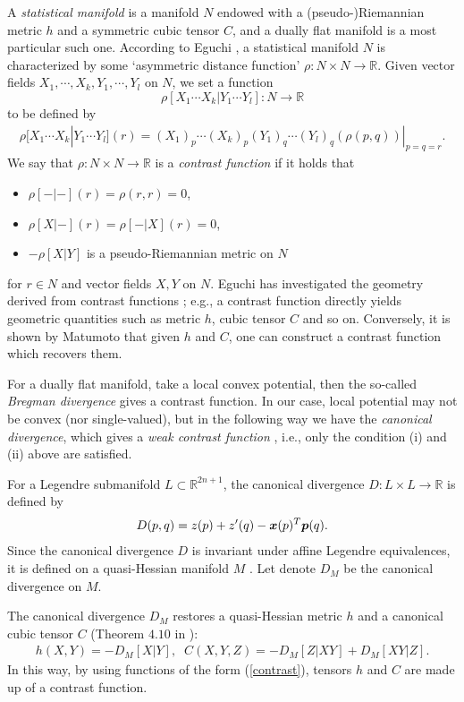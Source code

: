 \documentclass[10pt]{amsart}
\newcommand{\R}{\mathbb{R}}
\def\bx{\mbox{\boldmath $x$}}
\def\bp{\mbox{\boldmath $p$}}
\begin{document}
A {\em statistical manifold} is a manifold $N$ endowed with a (pseudo-)Riemannian metric $h$ and a symmetric cubic tensor $C$, 
and a dually flat manifold is a most particular such one. 
According to Eguchi \cite{Eguchi},  a statistical manifold $N$ is characterized by some `asymmetric distance function' $\rho: N \times N \to \R$. 
Given vector fields $X_1, \cdots, X_k, Y_1,\cdots, Y_l$ on $N$, 
we set a function 
$$\rho[X_1\cdots X_k|Y_1\cdots Y_l]:N\to\R$$
to be defined by
\begin{align}\label{contrast}
\rho[X_1\cdots X_k|Y_1\cdots Y_l](r) = (X_1)_p\cdots(X_k)_p(Y_1)_q\cdots(Y_l)_q(\rho(p,q))|_{p=q=r}. 
\end{align}
We say that $\rho:N\times N\to\R$ is a {\em contrast function} if it holds that
\begin{itemize}
\item[(i)] $\rho[-|-](r)=\rho(r,r) = 0$,
\item[(ii)] $\rho[X|-](r) = \rho[-|X](r) = 0$,
\item[(iii)] $-\rho[X|Y]$ is a pseudo-Riemannian metric on $N$
\end{itemize} 
for $r\in N$ and vector fields $X, Y$ on $N$. 
Eguchi has investigated the geometry derived from contrast functions \cite{Eguchi}; e.g., 
a contrast function directly yields geometric quantities such as metric $h$, cubic tensor $C$ and so on. 
Conversely, it is shown by Matumoto \cite{Matumoto} that given $h$ and $C$, one can construct a contrast function which recovers them. 



For a dually flat manifold, take a local convex potential, then the so-called {\em Bregman divergence} gives a contrast function.
In our case, local potential may not be convex (nor single-valued), but in the following way we have the {\em canonical divergence}, which gives a {\em weak contrast function} \cite{NT}, i.e., only the condition (i) and (ii) above are satisfied.

For a Legendre submanifold $L\subset\R^{2n+1}$, the canonical divergence $D:L\times L\to\R$ is defined by
\begin{align*}
  D(p, q) = z(p) + z'(q) - \bx(p)^T\bp(q).
\end{align*}
Since the canonical divergence $D$ is invariant under affine Legendre equivalences, it is defined on a quasi-Hessian manifold $M$ \cite{NT}. Let denote $D_M$ be the canonical divergence on $M$.

The canonical divergence $D_M$ restores a quasi-Hessian metric $h$ and a canonical cubic tensor $C$ (Theorem $4.10$ in \cite{NT}):
\begin{align*}
h(X,Y)=-D_M[X|Y], \;\; C(X, Y, Z) = -D_M[Z|XY] + D_M[XY|Z].
\end{align*}
In this way, by using functions of the form (\ref{contrast}), tensors $h$ and $C$ are made up of a contrast function.
\end{document}
